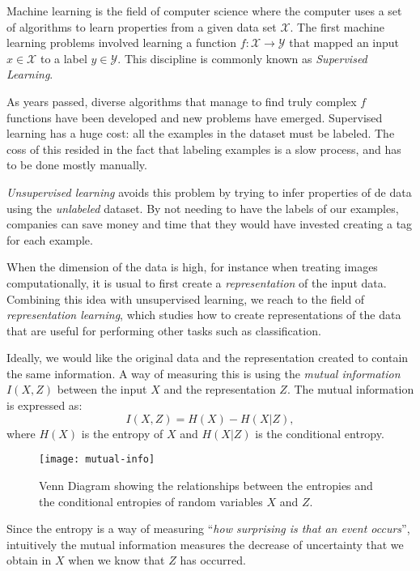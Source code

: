 
Machine learning is the field of computer science where the computer uses a set of algorithms to learn properties from a given data set $\mathcal X$. The first machine learning problems involved learning a function $f: \mathcal X \to \mathcal Y$ that mapped an input $x \in \mathcal X$ to a label $y \in \mathcal Y$. This discipline is commonly known as \emph{Supervised Learning}.

As years passed, diverse algorithms that manage to find truly complex $f$ functions have been developed and new problems have emerged. Supervised learning has a huge cost: all the examples in the dataset must be labeled. The coss of this resided in the fact that labeling examples is a slow process, and has to be done mostly manually. 

\emph{Unsupervised learning} avoids this problem by trying to infer properties of de data using the \emph{unlabeled} dataset. By not needing to have the labels of our examples, companies can save money and time that they would have invested creating a tag for each example.

When the dimension of the data is high, for instance when treating images computationally, it is usual to first create a \emph{representation} of the input data. Combining this idea with unsupervised learning, we reach to the field of \emph{representation learning}, which studies how to create representations of the data that are useful for performing other tasks such as classification.

Ideally, we would like the original data and the representation created to contain the same information. A way of measuring this is using the \emph{mutual information} $I(X,Z)$ between the input $X$ and the representation $Z$. The mutual information is expressed as:
\[
I(X,Z) = H(X) - H(X|Z),
\]
where $H(X)$ is the entropy of $X$ and $H(X|Z)$ is the conditional entropy.

\begin{figure}[H]
    \centering
    \texttt{[image: mutual-info]}
    \caption{Venn Diagram showing the relationships between the entropies and the conditional entropies of random variables $X$ and $Z$.}
\end{figure}

Since the entropy is a way of measuring ``\emph{how surprising is that an event occurs}'', intuitively the mutual information measures the decrease of uncertainty that we obtain in $X$ when we know that $Z$ has occurred.

